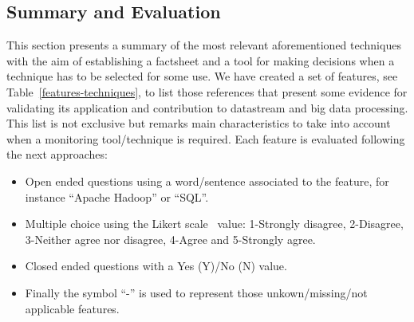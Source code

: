 \subsection{Summary and Evaluation}
This section presents a summary of the most relevant aforementioned techniques with the aim
of establishing a factsheet and a tool for making decisions when a technique 
has to be selected for some use. We have created a set of features, see Table~\ref{features-techniques}, 
to list those references that present some evidence for validating its application 
and contribution to datastream and big data processing. This list is not exclusive 
but remarks main characteristics to take into account when a monitoring tool/technique 
is required. Each feature is evaluated following the next approaches:
\begin{itemize}
 \item Open ended questions using a word/sentence associated to the feature, for instance ``Apache Hadoop'' or ``SQL''.
 \item Multiple choice using the Likert scale~\cite{albaum1997likert} value: 1-Strongly disagree, 2-Disagree, 3-Neither agree nor disagree, 4-Agree and 5-Strongly agree.
 \item Closed ended questions with a Yes (Y)/No (N) value.
 \item Finally the symbol ``-'' is used to represent those unkown/missing/not applicable features.
\end{itemize}


